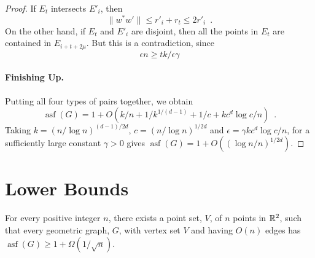 \documentclass{patmorin}
\DeclareMathOperator{\asf}{asf}
\begin{document}
\begin{proof}
  If $E_t$ intersects $E'_{i}$, then 
  \[
     \|w^*w'\|\le r'_i + r_t \le 2r'_i \enspace .
  \]
  On the other hand, if $E_t$ and $E'_{i}$ are disjoint, then all the points
  in $E_t$ are contained in $E_{i+t+2\mu}$.  But this is a contradiction,
  since
  \[
      \epsilon n \ge t k/\epsilon\gamma
  \]


  \paragraph{Finishing Up.}
  Putting all four types of pairs together, we obtain
  \[
     \asf(G) = 1 + O(k/n + 1/k^{1/(d-1)} + 1/c + kc^d\log c/n) \enspace .
  \]
  Taking $k=(n/\log n)^{(d-1)/2d}$, $c=(n/\log n)^{1/2d}$ and $\epsilon
  = \gamma kc^d\log c/n$, for a sufficiently large constant $\gamma >0$
  gives $\asf(G)=1+O((\log n/n)^{1/2d})$.
\end{proof}



\section{Lower Bounds}

\begin{thm}
  For every positive integer $n$, there exists a point set, $V$, of $n$
  points in $\mathbb{R}^2$, such that every geometric graph, $G$, with vertex
  set $V$ and having $O(n)$ edges has $\asf(G)\ge 1 + \Omega(1/\sqrt{n})$.
\end{thm}
\end{document}
